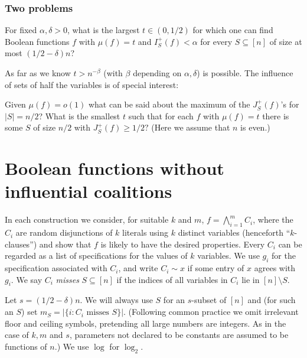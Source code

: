 \documentclass{toc}
\newcommand{\nin}[0]{\noindent}
\newcommand{\sub}[0]{\subseteq}
\newcommand{\sm}[0]{\setminus}
\newcommand{\0}[0]{\emptyset}
\newcommand{\ga}[0]{\alpha }
\newcommand{\gb}[0]{\beta }
\newcommand{\gd}[0]{\delta }
\begin{document}
%
%
%
%
%
%
%
%
%
%
%
%
%
%

%


\subsubsection* {Two problems}


\begin{question}\label{prop4}

For fixed $\alpha,\delta >0$, what is
the largest $t\in (0,1/2)$ for which one can find
Boolean functions $f$ with $\mu(f) =t$ and
$I^+_S(f)<\ga$ for every $S\sub [n]$ of size
at most %
$(1/2-\gd)n$?
\end{question}

\nin
As far as we know $t> n^{-\gb}$ (with $\gb$ depending on $\ga,\gd$)
is possible. The influence of sets of half the variables is of special interest:

\begin{question}\label{prop5}

Given $\mu(f) =o(1)$ what can be said about 
the maximum of
the   %
$J_S^+(f)$'s for $|S|=n/2$?  %
What is the smallest $t$ 
such that for each $f$ with $\mu(f) =t$ there is some
$S$ of size $n/2$ with $J_S^+(f) \ge 1/2 ?$
(Here we assume that $n$ is even.)  %
\end{question}



\section{Boolean functions without influential coalitions}
\label{examples}


In each construction we consider, for suitable $k$ and $m$,
%
$f= \bigwedge_{i=1}^m C_i$, where the  %
%
$C_i$   %
%
%
%
are random %
disjunctions  %
of $k$ literals
using $k$ distinct variables (henceforth ``$k$-clauses'')
and show that $f$ is likely to have the desired properties. 
Every $C_i$ can be regarded as a list of specifications for 
the values of $k$ variables.
We use $g_i$ for the specification associated with $C_i$,
and write $C_i\sim x$ if some entry of $x$ agrees with $g_i$.
We say $C_i$ \emph{misses} $S\sub [n]$ if the indices of all
variables in $C_i$ lie in $[n]\sm S$.


Let $s= (1/2-\gd)n$.  %
We will always
use $S$ for an $s$-subset of $[n]$ and
(for such an $S$) set
$m_S=|\{i:\mbox{$C_i$ misses $S$}\}|.$
(Following common practice we omit irrelevant
floor and ceiling symbols,
pretending all large numbers are integers.
As in the case of $k,m$ and $s$, parameters not declared
to be constants are assumed to be functions of $n$.)
We use $\log$ for $\log_2$.
\end{document}
